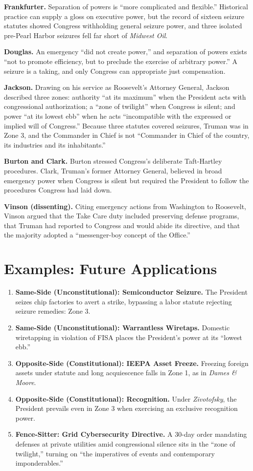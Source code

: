 \documentclass[12pt]{article}
\begin{document}
\textbf{Frankfurter.} Separation of powers is ``more complicated and flexible.'' Historical practice can supply a gloss on executive power, but the record of sixteen seizure statutes showed Congress withholding general seizure power, and three isolated pre-Pearl Harbor seizures fell far short of \textit{Midwest Oil}.

\textbf{Douglas.} An emergency ``did not create power,'' and separation of powers exists ``not to promote efficiency, but to preclude the exercise of arbitrary power.'' A seizure is a taking, and only Congress can appropriate just compensation.

\textbf{Jackson.} Drawing on his service as Roosevelt's Attorney General, Jackson described three zones: authority ``at its maximum'' when the President acts with congressional authorization; a ``zone of twilight'' when Congress is silent; and power ``at its lowest ebb'' when he acts ``incompatible with the expressed or implied will of Congress.'' Because three statutes covered seizures, Truman was in Zone 3, and the Commander in Chief is not ``Commander in Chief of the country, its industries and its inhabitants.''

\textbf{Burton and Clark.} Burton stressed Congress's deliberate Taft-Hartley procedures. Clark, Truman's former Attorney General, believed in broad emergency power when Congress is silent but required the President to follow the procedures Congress had laid down.

\textbf{Vinson (dissenting).} Citing emergency actions from Washington to Roosevelt, Vinson argued that the Take Care duty included preserving defense programs, that Truman had reported to Congress and would abide its directive, and that the majority adopted a ``messenger-boy concept of the Office.''

\section{Examples: Future Applications}

\begin{enumerate}
\item \textbf{Same-Side (Unconstitutional): Semiconductor Seizure.} The President seizes chip factories to avert a strike, bypassing a labor statute rejecting seizure remedies: Zone 3.
\item \textbf{Same-Side (Unconstitutional): Warrantless Wiretaps.} Domestic wiretapping in violation of FISA places the President's power at its ``lowest ebb.''
\item \textbf{Opposite-Side (Constitutional): IEEPA Asset Freeze.} Freezing foreign assets under statute and long acquiescence falls in Zone 1, as in \textit{Dames \& Moore}.
\item \textbf{Opposite-Side (Constitutional): Recognition.} Under \textit{Zivotofsky}, the President prevails even in Zone 3 when exercising an exclusive recognition power.
\item \textbf{Fence-Sitter: Grid Cybersecurity Directive.} A 30-day order mandating defenses at private utilities amid congressional silence sits in the ``zone of twilight,'' turning on ``the imperatives of events and contemporary imponderables.''
\end{enumerate}
\end{document}
